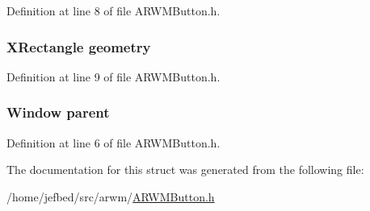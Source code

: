 Definition at line 8 of file ARWMButton.h.

\hypertarget{struct___a_r_w_m_button_aac33c74a9e108df3ab284cf3a1cc8e21}{
\subsubsection[{geometry}]{\setlength{\rightskip}{0pt plus 5cm}XRectangle {\bf geometry}}}
\label{struct___a_r_w_m_button_aac33c74a9e108df3ab284cf3a1cc8e21}


Definition at line 9 of file ARWMButton.h.

\hypertarget{struct___a_r_w_m_button_a9222d5f7d6d375ac2c052eefe78af8a3}{
\subsubsection[{parent}]{\setlength{\rightskip}{0pt plus 5cm}Window {\bf parent}}}
\label{struct___a_r_w_m_button_a9222d5f7d6d375ac2c052eefe78af8a3}


Definition at line 6 of file ARWMButton.h.



The documentation for this struct was generated from the following file:\begin{DoxyCompactItemize}
\item 
/home/jefbed/src/arwm/\hyperlink{_a_r_w_m_button_8h}{ARWMButton.h}\end{DoxyCompactItemize}
